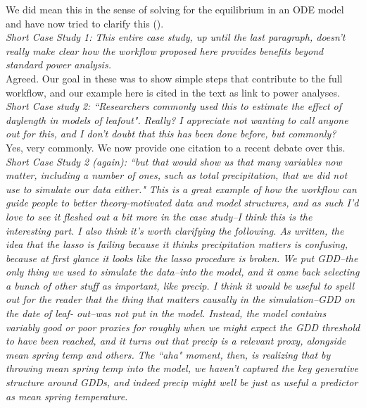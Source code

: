 \documentclass[11pt,a4paper]{article}
\begin{document}
We did mean this in the sense of solving for the equilibrium in an ODE model and have now tried to clarify this ().\\

\emph{Short Case Study 1: This entire case study, up until the last paragraph, doesn't really make clear how the workflow proposed here provides benefits beyond standard power analysis.}\\

Agreed. Our goal in these was to show simple steps that contribute to the full workflow, and our example here is cited in the text as link to power analyses.\\

\emph{Short Case study 2: ``Researchers commonly used this to estimate the effect of daylength in models of leafout". Really? I appreciate not wanting to call anyone out for this, and I don't doubt that this has been done before, but
commonly?}\\

Yes, very commonly. We now provide one citation to a recent debate over this.\\

\emph{Short Case Study 2 (again): ``but that would show us that many variables now matter, including a number of ones, such as total precipitation, that we did not use to simulate our data either." This is a great example of how the workflow can guide people to better theory-motivated data and model structures, and as such I'd love to see it fleshed out a bit more in the case study--I think this is the interesting part. I also think it's worth clarifying the following. As written, the idea that the lasso is failing because it thinks precipitation matters is confusing, because at first glance it looks like the lasso procedure is broken. We put GDD--the only thing we used to simulate the data--into the model, and it came back selecting a bunch of other stuff as important, like precip. I think it would be useful to spell out for the reader that the thing that matters causally in the simulation--GDD on the date of leaf- out--was not put in the model. Instead, the model contains variably good or poor proxies for roughly when we might expect the GDD threshold to have been reached, and it turns out that precip is a relevant proxy, alongside mean spring temp and others. The ``aha" moment, then, is realizing that by throwing mean spring temp into the model, we haven't captured the key generative structure around GDDs, and indeed precip might well be just as useful a predictor as mean spring temperature.}\\
\end{document}
